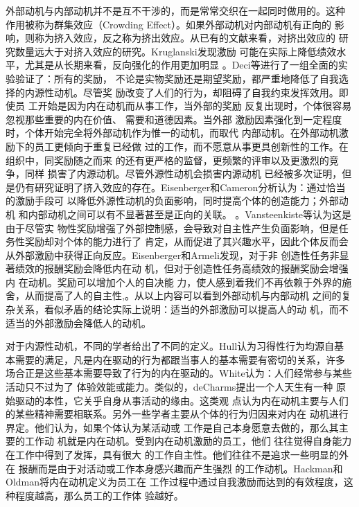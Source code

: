 \documentclass[12pt,a4paper,cs4size]{ctexart}
\begin{document}
外部动机与内部动机并不是互不干涉的，而是常常交织在一起同时做用的。这种
作用被称为群集效应（Crowding Effect）。如果外部动机对内部动机有正向的
影响，则称为挤入效应，反之称为挤出效应。从已有的文献来看，对挤出效应的
研究数量远大于对挤入效应的研究。Kruglanski发现激励
可能在实际上降低绩效水平，尤其是从长期来看，反向强化的作用更加明显
\cite{Kruglanski1978}。Deci等进行了一组全面的实验验证了：所有的奖励，
不论是实物奖励还是期望奖励，都严重地降低了自我选择的内源性动机。尽管奖
励改变了人们的行为，却阻碍了自我约束发挥效用\cite{deci1999mar}。即使员
工开始是因为内在动机而从事工作，当外部的奖励
反复出现时，个体很容易忽视那些重要的内在价值、
需要和道德因素\cite{deci2000agp}。当外部
激励因素强化到一定程度时，个体开始完全将外部动机作为惟一的动机，而取代
内部动机\cite{kasser2002hpm}。在外部动机激励下的员工更倾向于重复已经做
过的工作，而不愿意从事更具创新性的工作\cite{amabile1998kc}\cite{schwartz1993cad}。在组织中，同奖励随之而来
的还有更严格的监督，更频繁的评审以及更激烈的竞争\cite{Kohn1993}，同样
损害了内源动机\cite{deci1985ima}。尽管外源性动机会损害内源动机
已经被多次证明，但是仍有研究证明了挤入效应的存在。Eisenberger和Cameron分析认为：通过恰当的激励手段可
以降低外源性动机的负面影响，同时提高个体的创造能力；外部动机
和内部动机之间可以有不显著甚至是正向的关联。
\cite{eisenberger1996der}。Vansteenkiste等认为这是由于尽管实
物性奖励增强了外部控制感，会导致对自主性产生负面影响，但是任务性奖励却对个体的能力进行了
肯定，从而促进了其兴趣水平，因此个体反而会从外部激励中获得正向反应\cite{vansteenkiste2003ccr}。Eisenberger和Armeli发现，对于非
创造性任务非显著绩效的报酬奖励会降低内在动
机，但对于创造性任务高绩效的报酬奖励会增强内
在动机\cite{eisenberger1997csr}。奖励可以增加个人的自决能
力，使人感到着我们不再依赖于外界的施舍，从而提高了人的自主性\cite{eisenberger1999dpp},\cite{eisenberger1999eri}。从以上内容可以看到外部动机与内部动机
之间的复杂关系，看似矛盾的结论实际上说明：适当的外部激励可以提高人的动
机，而不适当的外部激励会降低人的动机。



对于内源性动机，不同的学者给出了不同的定义。Hull认为习得性行为均源自基
本需要的满足，凡是内在驱动的行为都跟当事人的基本需要有密切的关系，许多
场合正是这些基本需要导致了行为的内在驱动的\cite{hull1943pbi}。White认为：人们经常参与某些活动只不过为了
体验效能或能力\cite{white66wmr}。类似的，deCharms提出一个人天生有一种
原始驱动的本性，它关乎自身从事活动的缘由\cite{decharms1968pci}。这类观
点认为内在动机主要与人们的某些精神需要相联系\cite{Kanfer1990}。另外一些学者主要从个体的行为归因来对内在
动机进行界定。他们认为，如果个体认为某活动或
工作是自己本身愿意去做的，那么其主要的工作动
机就是内在动机。受到内在动机激励的员工，他们
往往觉得自身能力在工作中得到了发挥，具有很大
的工作自主性。他们往往不是追求一些明显的外在
报酬而是由于对活动或工作本身感兴趣而产生强烈
的工作动机\cite{chenandwu2008}。Hackman和Oldman将内在动机定义为员工在
工作过程中通过自我激励而达到的有效程度，这种程度越高，那么员工的工作体
验越好\cite{hackman1975djd}。
\end{document}
